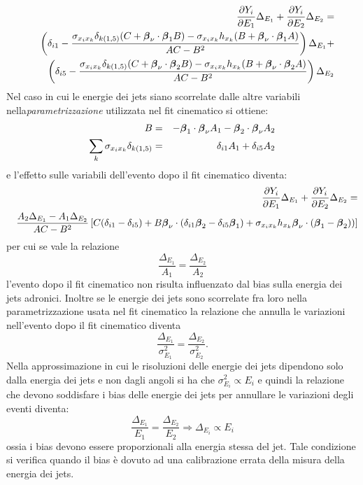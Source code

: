 \begin{eqnarray*}
&&\frac{\partial Y_i}{\partial E_1}\Delta_{E_1}+  \frac{\partial Y_i}{\partial E_2}\Delta_{E_2}=\\
&&\left(\delta_{i1}-\frac{\sigma_{x_ix_k}\delta_{k(1,5)}(C+\mbox{\boldmath $\beta$}_\nu\cdot\mbox{\boldmath $\beta$}_1 B)-\sigma_{x_ix_k}h_{x_k}(B+\mbox{\boldmath $\beta$}_\nu\cdot\mbox{\boldmath $\beta$}_1 A)}{AC-B^2}\right)\Delta_{E_1}+\\
&&\left(\delta_{i5}-\frac{\sigma_{x_ix_k}\delta_{k(1,5)}(C+\mbox{\boldmath $\beta$}_\nu\cdot\mbox{\boldmath $\beta$}_2 B)-\sigma_{x_ix_k}h_{x_k}(B+\mbox{\boldmath $\beta$}_\nu\cdot\mbox{\boldmath $\beta$}_2 A)}{AC-B^2}\right)\Delta_{E_2}
\end{eqnarray*}
Nel caso in cui le energie dei jets siano scorrelate dalle altre variabili nella{\em parametrizzazione} utilizzata nel fit cinematico si ottiene:
\begin{eqnarray*}
B&=&-\mbox{\boldmath $\beta$}_1\cdot\mbox{\boldmath $\beta$}_\nu A_1-\mbox{\boldmath $\beta$}_2\cdot\mbox{\boldmath $\beta$}_\nu A_2\\
\sum_k\sigma_{x_ix_k}\delta_{k(1,5)}&=&\delta_{i1}A_1+\delta_{i5}A_2
\end{eqnarray*}
e l'effetto sulle variabili dell'evento dopo il fit cinematico diventa:
\begin{eqnarray*}
&&\frac{\partial Y_i}{\partial E_1}\Delta_{E_1}+  \frac{\partial Y_i}{\partial E_2}\Delta_{E_2}=\\
&&\frac{A_2\Delta_{E_1}-A_1\Delta_{E_2}}{AC-B^2}\left[C(\delta_{i1}-\delta_{i5})+B\mbox{\boldmath $\beta$}_\nu\cdot(\delta_{i1}\mbox{\boldmath $\beta$}_2-\delta_{i5}\mbox{\boldmath $\beta$}_1)+\sigma_{x_ix_k}h_{x_k}\mbox{\boldmath $\beta$}_\nu\cdot(\mbox{\boldmath $\beta$}_1-\mbox{\boldmath $\beta$}_2))\right]
\end{eqnarray*}
per cui se vale la relazione\[\frac{\Delta_{E_1}}{A_1}=\frac{\Delta_{E_2}}{A_2}\]
l'evento dopo il fit cinematico non risulta influenzato dal bias sulla energia
dei jets adronici. Inoltre se le energie dei jets sono scorrelate fra loro nella
parametrizzazione usata nel fit cinematico la relazione che annulla le variazioni
nell'evento dopo il fit cinematico diventa
\[\frac{\Delta_{E_1}}{\sigma^2_{E_1}}=\frac{\Delta_{E_2}}{\sigma^2_{E_2}}.\]
Nella approssimazione in cui le risoluzioni delle energie dei jets dipendono solo
dalla energia dei jets e non dagli angoli si ha che $\sigma^2_{E_i}\propto E_i$
e quindi la relazione che devono soddisfare i bias delle energie dei jets per annullare le variazioni degli eventi diventa:
\[\frac{\Delta_{E_1}}{E_1}=\frac{\Delta_{E_2}}{E_2}\Rightarrow\Delta_{E_i}\propto E_i\]
ossia i bias devono essere proporzionali alla energia stessa del jet. Tale condizione
si verifica quando il bias \`e dovuto ad una calibrazione errata della misura della
energia dei jets.\\
